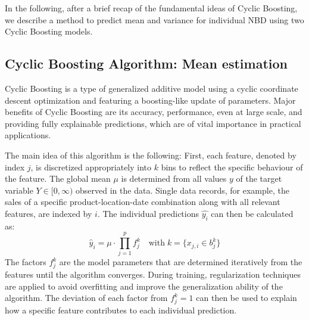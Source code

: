 \documentclass[BCOR=1mm, DIV=calc,10pt,
twoside=true,
twocolumn,
headings=normal]{scrartcl}
\begin{document}
In the following, after a brief recap of the fundamental ideas of Cyclic Boosting, we describe a method to predict mean and variance for individual NBD using two Cyclic Boosting models.

\subsection{Cyclic Boosting Algorithm: Mean estimation}
\label{sec:CB}

Cyclic Boosting is a type of generalized additive model using a cyclic coordinate descent optimization and featuring a boosting-like update of parameters. Major benefits of Cyclic Boosting are its accuracy, performance, even at large scale, and providing fully explainable predictions, which are of vital importance in practical applications.

The main idea of this algorithm is the following: First, each feature, denoted by index $j$, is discretized appropriately into $k$ bins to reflect the specific behaviour of the feature. The global mean $\mu$ is determined from all values $y$ of the  target variable $Y \in [0,\infty)$ observed in the data. Single data records, for example, the sales of a specific product-location-date combination along with all relevant features, are indexed by $i$.
The individual predictions $\hat{y_i}$  can then be calculated as:
\begin{equation} \label{eqn:cb}
\hat{y}_i = \mu \cdot \prod \limits_{j=1}^p f^k_j \quad \text{with}\; k=\{ x_{j,i} \in b^k_j\}
\end{equation}
The factors $f^k_j$ are the model parameters that are determined iteratively from the features until the algorithm converges. During training, regularization techniques are applied to avoid overfitting and improve the generalization ability of the algorithm. The deviation of each factor from $f^k_j=1$ can then be used to explain how a specific feature contributes to each individual prediction.
\end{document}
